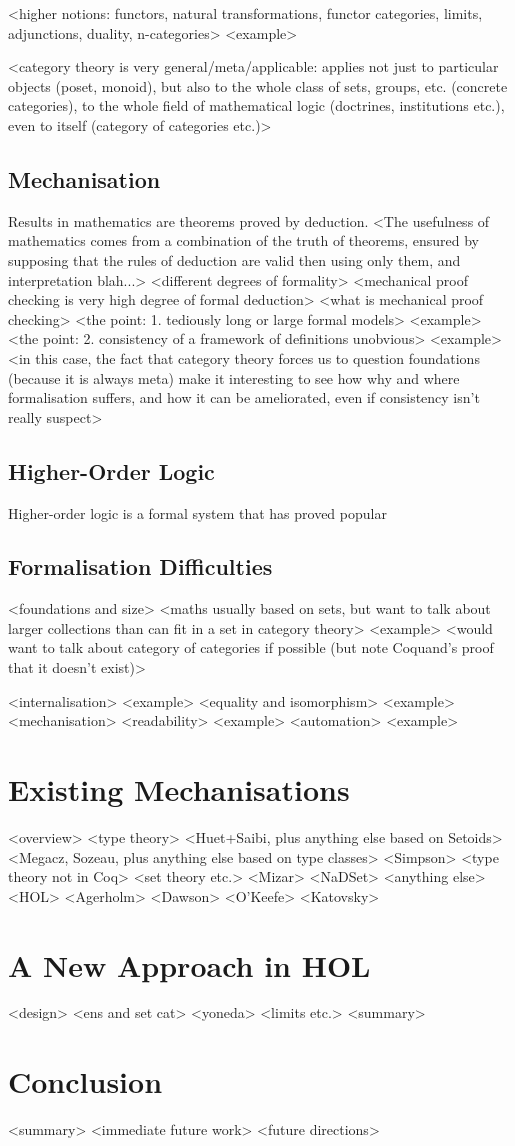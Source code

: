 \documentclass[twoside,titlepage,11pt]{article}
\begin{document}
<higher notions: functors, natural transformations, functor categories, limits, adjunctions, duality, n-categories>%
  <example>

<category theory is very general/meta/applicable: applies not just to particular objects (poset, monoid), but also to the whole class of sets, groups, etc. (concrete categories), to the whole field of mathematical logic (doctrines, institutions etc.), even to itself (category of categories etc.)>%
\subsection{Mechanisation}%
Results in mathematics are theorems proved by deduction.
  <The usefulness of mathematics comes from a combination of the truth of theorems, ensured by supposing that the rules of deduction are valid then using only them, and interpretation blah...>
  <different degrees of formality>
  <mechanical proof checking is very high degree of formal deduction>%
<what is mechanical proof checking>%
<the point: 1. tediously long or large formal models>%
  <example>
<the point: 2. consistency of a framework of definitions unobvious>%
  <example>
<in this case, the fact that category theory forces us to question foundations (because it is always meta) make it interesting to see how why and where formalisation suffers, and how it can be ameliorated, even if consistency isn't really suspect>%
\subsection{Higher-Order Logic}%
Higher-order logic is a formal system that has proved popular
\subsection{Formalisation Difficulties}%
<foundations and size>%
  <maths usually based on sets, but want to talk about larger collections than can fit in a set in category theory>
  <example>
  <would want to talk about category of categories if possible (but note Coquand's proof that it doesn't exist)>

<internalisation>%
  <example>
<equality and isomorphism>%
  <example>
<mechanisation>
  <readability>%
    <example>
  <automation>%
    <example>
\section{Existing Mechanisations}%
<overview>%
<type theory>%
  <Huet+Saibi, plus anything else based on Setoids>%
  <Megacz, Sozeau, plus anything else based on type classes>%
  <Simpson>%
  <type theory not in Coq>%
<set theory etc.>%
  <Mizar>%
  <NaDSet>%
  <anything else>%
<HOL>%
  <Agerholm>%
  <Dawson>%
  <O'Keefe>%
  <Katovsky>%
\section{A New Approach in HOL}%
<design>%
<ens and set cat>%
<yoneda>%
<limits etc.>%
<summary>%
\section{Conclusion}%
<summary>%
<immediate future work>%
<future directions>%


\end{document}
